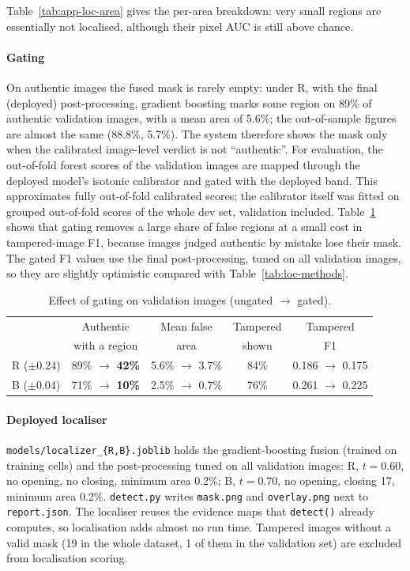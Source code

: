 Table~\ref{tab:app-loc-area} gives the per-area breakdown: very small regions are essentially not localised, although their pixel AUC is still above chance.

\paragraph{Gating} On authentic images the fused mask is rarely empty: under R, with the final (deployed) post-processing, gradient boosting marks some region on 89\% of authentic validation images, with a mean area of 5.6\%; the out-of-sample figures are almost the same (88.8\%, 5.7\%). The system therefore shows the mask only when the calibrated image-level verdict is not ``authentic''. For evaluation, the out-of-fold forest scores of the validation images are mapped through the deployed model's isotonic calibrator and gated with the deployed band. This approximates fully out-of-fold calibrated scores; the calibrator itself was fitted on grouped out-of-fold scores of the whole dev set, validation included. Table~\ref{tab:loc-gating} shows that gating removes a large share of false regions at a small cost in tampered-image F1, because images judged authentic by mistake lose their mask. The gated F1 values use the final post-processing, tuned on all validation images, so they are slightly optimistic compared with Table~\ref{tab:loc-methods}.

\begin{table}[!ht]
\centering
\caption{Effect of gating on validation images (ungated $\to$ gated).}
\label{tab:loc-gating}
\footnotesize
\begin{tabular}{lcccc}
\toprule
 & Authentic & Mean false & Tampered & Tampered \\
 & with a region & area & shown & F1 \\
\midrule
R ($\pm$0.24) & 89\% $\to$ \textbf{42\%} & 5.6\% $\to$ 3.7\% & 84\% & 0.186 $\to$ 0.175 \\
B ($\pm$0.04) & 71\% $\to$ \textbf{10\%} & 2.5\% $\to$ 0.7\% & 76\% & 0.261 $\to$ 0.225 \\
\bottomrule
\end{tabular}
\end{table}

\paragraph{Deployed localiser} \texttt{models/localizer\_\{R,B\}.joblib} holds the gradient-boosting fusion (trained on training cells) and the post-processing tuned on all validation images: R, $t = 0.60$, no opening, no closing, minimum area 0.2\%; B, $t = 0.70$, no opening, closing 17, minimum area 0.2\%. \texttt{detect.py} writes \texttt{mask.png} and \texttt{overlay.png} next to \texttt{report.json}. The localiser reuses the evidence maps that \texttt{detect()} already computes, so localisation adds almost no run time. Tampered images without a valid mask (19 in the whole dataset, 1 of them in the validation set) are excluded from localisation scoring.

